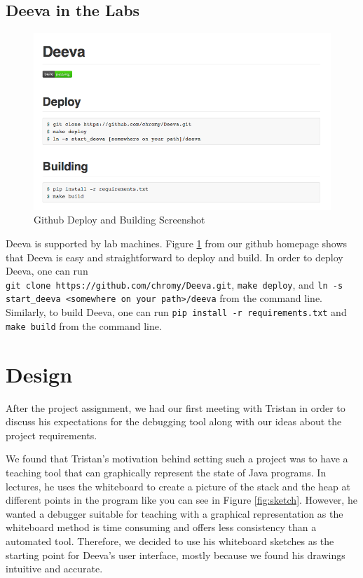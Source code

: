 \documentclass[11pt, a4paper]{article}
\begin{document}
\subsection{Deeva in the Labs}
\begin{figure}[h!]
\centering
\includegraphics[scale=0.5]{buildFeature.png}
\caption{Github Deploy and Building Screenshot}
\label{fig:buildFeature}
\end{figure}
Deeva is supported by lab machines.
Figure \ref{fig:buildFeature} from our github homepage shows that Deeva is easy and straightforward to deploy and build.
In order to deploy Deeva, one can run \\
{\tt git clone https://github.com/chromy/Deeva.git}, {\tt make deploy}, and {\tt ln -s start\_deeva <somewhere on your path>/deeva} from the command line.
Similarly, to build Deeva, one can run {\tt pip install -r requirements.txt} and {\tt make build} from the command line.

\section{Design}

After the project assignment, we had our first meeting with Tristan in order to discuss his expectations for the debugging tool along with our ideas about the project requirements.

We found that Tristan's motivation behind setting such a project was to have a teaching tool that can graphically represent the state of Java programs. In lectures, he uses the whiteboard to create a picture of the stack and the heap at different points in the program like you can see in Figure \ref{fig:sketch}. However, he wanted a debugger suitable for teaching with a graphical representation as the whiteboard method is time consuming and offers less consistency than a automated tool.
Therefore, we decided to use his whiteboard sketches as the starting point for Deeva's user interface, mostly because we found his drawings intuitive and accurate.
\end{document}
